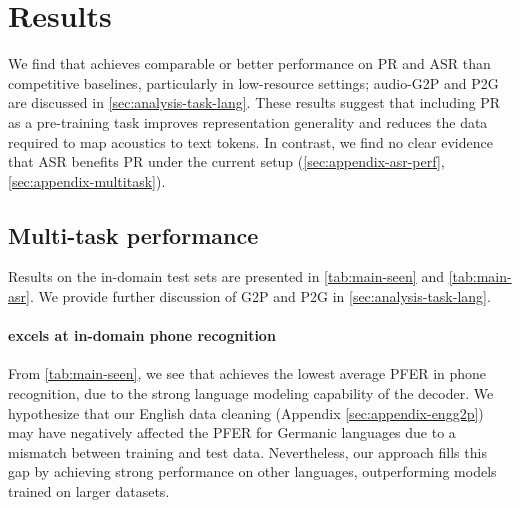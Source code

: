 \section{Results}
We find that \POWSM achieves comparable or better performance on PR and ASR than competitive baselines, particularly in low-resource settings; audio-G2P and P2G are discussed in \autoref{sec:analysis-task-lang}. These results suggest that including PR as a pre-training task improves representation generality and reduces the data required to map acoustics to text tokens.
In contrast, we find no clear evidence that ASR benefits PR under the current setup (\autoref{sec:appendix-asr-perf}, \autoref{sec:appendix-multitask}).

\subsection{Multi-task performance}
Results on the in-domain test sets are presented in \autoref{tab:main-seen} and \autoref{tab:main-asr}. We provide further discussion of G2P and P2G in \autoref{sec:analysis-task-lang}.

\paragraph{\POWSM excels at in-domain phone recognition} From \autoref{tab:main-seen}, we see that \POWSM achieves the lowest average PFER in phone recognition, due to the strong language modeling capability of the decoder.
We hypothesize that our English data cleaning (Appendix \autoref{sec:appendix-engg2p}) may have negatively affected the PFER for Germanic languages due to a mismatch between training and test data. 
Nevertheless, our approach fills this gap by achieving strong performance on other languages, outperforming models trained on larger datasets.

